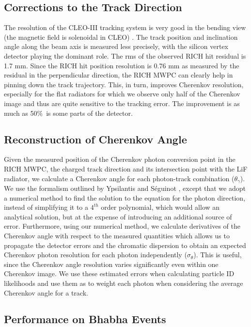 \documentclass[fleqn,twoside]{article}
\begin{document}
\subsection{Corrections to the Track Direction}

The resolution of the CLEO-III tracking system is very good in the
bending view (the magnetic field is solenoidal in CLEO)
\cite{Peterson} . The track position and inclination angle along
the beam axis is measured less precisely, with the silicon vertex
detector playing the dominant role. The rms of the observed RICH
hit residual is 1.7 mm. Since the RICH hit position resolution is
0.76 mm as measured by the residual in the perpendicular
direction, the RICH MWPC can clearly help in pinning down the
track trajectory. This, in turn, improves Cherenkov resolution,
especially for the flat radiators for which we observe only half
of the Cherenkov image and thus are quite sensitive to the
tracking error. The improvement is as much as 50\%\ is some parts
of the detector.

\subsection{Reconstruction of Cherenkov Angle}

Given the measured position of the Cherenkov photon conversion
point in the RICH MWPC, the charged track direction and its
intersection point with the LiF radiator, we calculate a Cherenkov
angle for each photon-track combination ($\theta_\gamma$). We use
the formalism outlined by Ypsilantis and S\'{e}guinot \cite{t+j},
except that we adopt a numerical method to find the solution to the
equation for the photon direction, instead of simplifying it to a
$4^{th}$ order polynomial, which would allow an analytical
solution, but at the expense of introducing an additional source
of error. Furthermore, using our numerical method, we calculate
derivatives of the Cherenkov angle with respect to the measured
quantities which allows us to propagate the detector errors and
the chromatic dispersion to obtain an expected Cherenkov photon
resolution for each photon independently ($\sigma_\theta$). This
is useful, since the Cherenkov angle resolution varies
significantly even within one Cherenkov image. We use these
estimated errors when calculating particle ID likelihoods and use
them as to weight each photon when considering the average
Cherenkov angle for a track.

\subsection{Performance on Bhabha Events}
\end{document}
